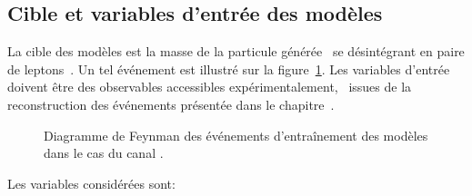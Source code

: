 \subsection{Cible et variables d'entrée des modèles}\label{chapter-ML-section-evt_gen-inputs}
La cible des modèles est la masse de la particule générée \higgsML\ se désintégrant en paire de leptons~\tau.
Un tel événement est illustré sur la figure~\ref{fig-model_inputs-fgraph-H-BBtautau_mutau_small}.
Les variables d'entrée doivent être des observables accessibles expérimentalement,
\ie\ issues de la reconstruction des événements présentée dans le chapitre~.
\begin{figure}[h]
\centering
{\def\Higgs{\higgsML}}
\caption[Diagramme de Feynman des événements d'entraînement des modèles.]{Diagramme de Feynman des événements d'entraînement des modèles dans le cas du canal \mu\tauh.}
\label{fig-model_inputs-fgraph-H-BBtautau_mutau_small}
\end{figure}
\par
Les variables considérées sont:
